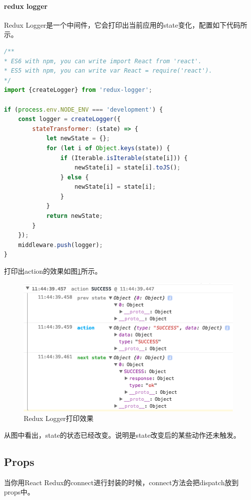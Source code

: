 \documentclass[letter]{book}
\begin{document}
\paragraph{redux logger}

Redux Logger是一个中间件，它会打印出当前应用的state变化，配置如下代码所示。

\begin{lstlisting}[language=Javascript]
/**
* ES6 with npm, you can write import React from 'react'. 
* ES5 with npm, you can write var React = require('react').
*/
import {createLogger} from 'redux-logger';

if (process.env.NODE_ENV === 'development') {
	const logger = createLogger({
		stateTransformer: (state) => {
			let newState = {};
			for (let i of Object.keys(state)) {
				if (Iterable.isIterable(state[i])) {
					newState[i] = state[i].toJS();
				} else {
					newState[i] = state[i];
				}
			}
			return newState;
		}
	});
	middleware.push(logger);
}
\end{lstlisting}

打印出action的效果如图\ref{fig:reduxloggerexample}所示。

\begin{figure}[htbp]
	\centering
	\includegraphics[scale=0.6]{reduxloggerexample.png}
	\caption{Redux Logger打印效果}
	\label{fig:reduxloggerexample}
\end{figure}

从图中看出，state的状态已经改变。说明是state改变后的某些动作还未触发。

\subsection{Props}

当你用React Redux的connect进行封装的时候，connect方法会把dispatch放到props中。
\end{document}
